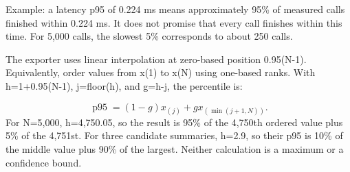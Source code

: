 \documentclass[10pt,a4paper]{article}
\begin{document}
Example:\allowbreak{} a latency p95 of 0.224 ms means approximately 95\% of measured calls finished within 0.224 ms. It does not promise that every call finishes within this time. For 5,000 calls, the slowest 5\% corresponds to about 250 calls.

The exporter uses linear interpolation at zero-based position 0.95(N-1). Equivalently, order values from x(1) to x(N) using one-based ranks. With h=1+0.95(N-1), j=floor(h), and g=h-j, the percentile is:\allowbreak{}

\[\operatorname{p95}=(1-g)x_{(j)}+g x_{(\min(j+1,N))}.\]
For N=5,000, h=4,750.05, so the result is 95\% of the 4,750th ordered value plus 5\% of the 4,751st. For three candidate summaries, h=2.9, so their p95 is 10\% of the middle value plus 90\% of the largest. Neither calculation is a maximum or a confidence bound.
\end{document}
